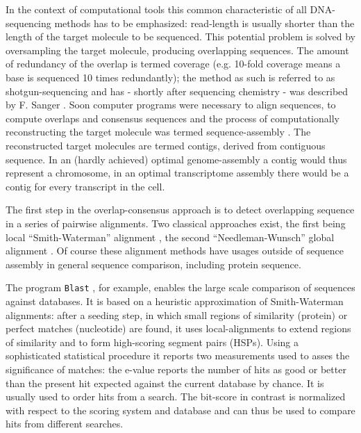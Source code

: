 In the context of computational tools this common characteristic of
all DNA-sequencing methods has to be emphasized: read-length is
usually shorter than the length of the target molecule to be
sequenced. This potential problem is solved by oversampling the target
molecule, producing overlapping sequences. The amount of redundancy of
the overlap is termed coverage (e.g. 10-fold coverage means a base is
sequenced 10 times redundantly); the method as such is referred to as
shotgun-sequencing and has - shortly after sequencing chemistry - was
described by F. Sanger \cite{pmid6260957}. Soon computer programs were
necessary to align sequences, to compute overlaps and consensus
sequences \cite{pmid461197} and the process of computationally
reconstructing the target molecule was termed sequence-assembly
\cite{pmid6251542}. The reconstructed target molecules are termed
contigs, derived from contiguous sequence. In an (hardly achieved)
optimal genome-assembly a contig would thus represent a chromosome, in
an optimal transcriptome assembly there would be a contig for every
transcript in the cell.

The first step in the overlap-consensus approach is to detect
overlapping sequence in a series of pairwise alignments. Two classical
approaches exist, the first being local ``Smith-Waterman'' alignment
\cite{pmid7265238}, the second ``Needleman-Wunsch'' global alignment
\cite{pmid7334527}. Of course these alignment methods have usages
outside of sequence assembly in general sequence comparison, including
protein sequence.

The program \texttt{Blast} \cite{pmid2231712}, for example, enables
the large scale comparison of sequences against databases. It is based
on a heuristic approximation of Smith-Waterman alignments: after a
seeding step, in which small regions of similarity (protein) or
perfect matches (nucleotide) are found, it uses local-alignments to
extend regions of similarity and to form high-scoring segment pairs
(HSPs). Using a sophisticated statistical procedure it reports two
measurements used to asses the significance of matches: the e-value
reports the number of hits as good or better than the present hit
expected against the current database by chance. It is usually used to
order hits from a search. The bit-score in contrast is normalized with
respect to the scoring system and database and can thus be used to
compare hits from different searches.

